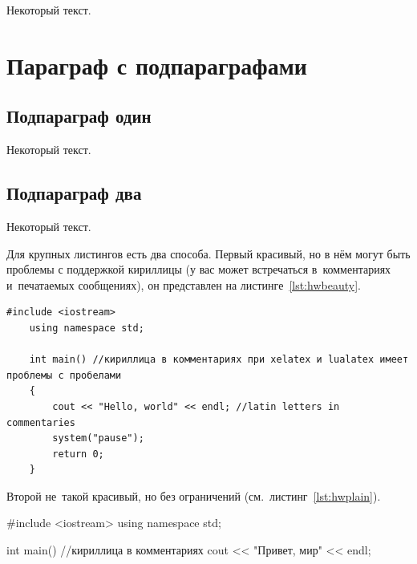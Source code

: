 Некоторый текст.

\section{Параграф с подпараграфами}\label{sec:ch5/sect3}

\subsection{Подпараграф \texorpdfstring{\cyrdash{}}{---} один}\label{subsec:ch5/sect3/sub1}

Некоторый текст.

\subsection{Подпараграф \texorpdfstring{\cyrdash{}}{---} два}\label{subsec:ch5/sect3/sub2}

Некоторый текст.

Для крупных листингов есть два способа. Первый красивый, но в нём могут быть
проблемы с поддержкой кириллицы (у вас может встречаться в~комментариях
и~печатаемых сообщениях), он представлен на листинге~\cref{lst:hwbeauty}.
\begin{ListingEnv}[!h]%
    \captiondelim{ } %
    \caption{Программа ,,Hello, world`` на \protect\cpp}\label{lst:hwbeauty}
    \begin{lstlisting}[language={[ISO]C++}]
	#include <iostream>
	using namespace std;

	int main() //кириллица в комментариях при xelatex и lualatex имеет проблемы с пробелами
	{
		cout << "Hello, world" << endl; //latin letters in commentaries
		system("pause");
		return 0;
	}
    \end{lstlisting}
\end{ListingEnv}%
Второй не~такой красивый, но без ограничений (см.~листинг~\cref{lst:hwplain}).
\begin{ListingEnv}[!h]
    \captiondelim{ } %
    \caption{Программа ,,Hello, world`` без подсветки}\label{lst:hwplain}
    \begin{Verb}

        #include <iostream>
        using namespace std;

        int main() //кириллица в комментариях
        {
            cout << "Привет, мир" << endl;
        }
    \end{Verb}
\end{ListingEnv}

